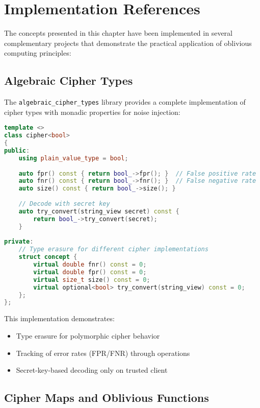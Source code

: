 \section{Implementation References}
\label{sec:implementation-refs}

The concepts presented in this chapter have been implemented in several complementary projects that demonstrate the practical application of oblivious computing principles:

\subsection{Algebraic Cipher Types}

The \texttt{algebraic\_cipher\_types} library provides a complete implementation of cipher types with monadic properties for noise injection:

\begin{lstlisting}[language=C++, caption={Cipher boolean type with false positive/negative rates}]
template <>
class cipher<bool>
{
public:
    using plain_value_type = bool;
    
    auto fpr() const { return bool_->fpr(); }  // False positive rate
    auto fnr() const { return bool_->fnr(); }  // False negative rate
    auto size() const { return bool_->size(); }
    
    // Decode with secret key
    auto try_convert(string_view secret) const {
        return bool_->try_convert(secret);
    }
    
private:
    // Type erasure for different cipher implementations
    struct concept {
        virtual double fnr() const = 0;
        virtual double fpr() const = 0;
        virtual size_t size() const = 0;
        virtual optional<bool> try_convert(string_view) const = 0;
    };
};
\end{lstlisting}

This implementation demonstrates:
\begin{itemize}
\item Type erasure for polymorphic cipher behavior
\item Tracking of error rates (FPR/FNR) through operations
\item Secret-key-based decoding only on trusted client
\end{itemize}

\subsection{Cipher Maps and Oblivious Functions}

